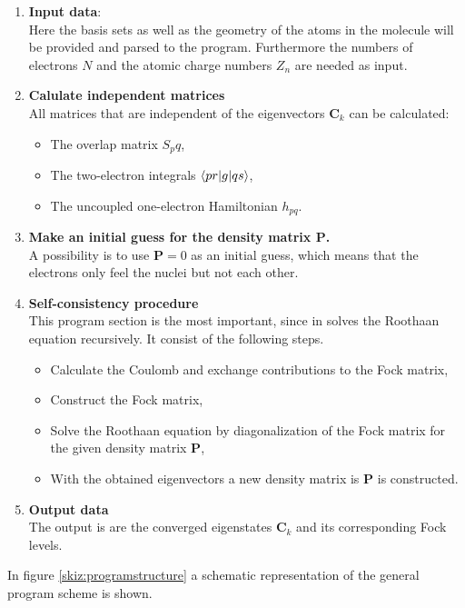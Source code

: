 \documentclass[twoside,        %
			   12pt,			%
               BCOR10mm,       %
               ngerman,english  %
               ]{scrartcl}
\begin{document}
\begin{enumerate}
	\item \textbf{Input data}:\\
	Here the basis sets as well as the geometry of the atoms in the molecule will be provided and parsed to the program. Furthermore the numbers of electrons $N$ and the atomic charge numbers $Z_n$ are needed as input.
	\item \textbf{Calulate independent matrices}\\
	All matrices that are independent of the eigenvectors $\mathbf{C}_k$ can be calculated:
	\begin{itemize}
		\item The overlap matrix $S_pq$,
		\item The two-electron integrals $\braket{pr|g|qs}$,
		\item The uncoupled one-electron Hamiltonian $h_{pq}$.
	\end{itemize}
	\item \textbf{Make an initial guess for the density matrix $\mathbf{P}$.}\\
	A possibility is to use $\mathbf{P} = 0$ as an initial guess, which means that the electrons only feel the nuclei but not each other.
	\item \textbf{Self-consistency procedure}\\
	This program section is the most important, since in solves the Roothaan equation recursively. It consist of the following steps.
	\begin{itemize}
		\item Calculate the Coulomb and exchange contributions to the Fock matrix,
		\item Construct the Fock matrix,
		\item Solve the Roothaan equation by diagonalization of the Fock matrix for the given density matrix $\mathbf{P}$,
		\item With the obtained eigenvectors a new density matrix is $\mathbf{P}$ is constructed.
	\end{itemize}
	\item \textbf{Output data}\\
	The output is are the converged eigenstates $\mathbf{C}_k$ and its corresponding Fock levels.
\end{enumerate}

In figure \ref{skiz:programstructure} a schematic representation of the general program scheme is shown.
\newpage    
    
\end{document}
